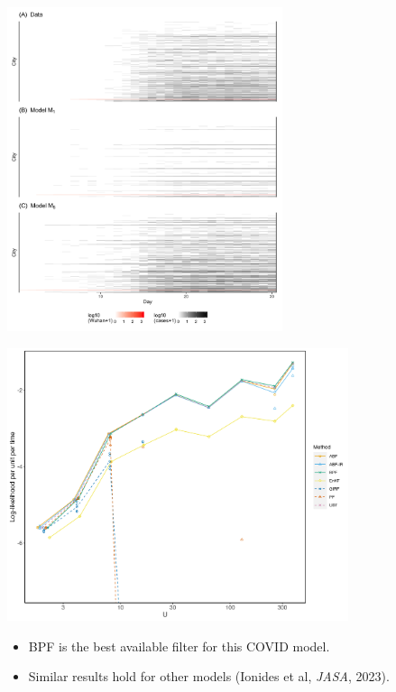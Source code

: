 \documentclass{beamer}
\begin{document}
\begin{frame}
  \begin{center}
    \includegraphics[height=9.5cm]{covid/panel_plot-1.png}
    \end{center}
\end{frame}


\begin{frame}
 \includegraphics[width=10cm]{covid/filter_tests10.png}

  \begin{itemize}
\item BPF is the best available filter for this COVID model.
\item Similar results hold for other models (Ionides et al, {\it JASA}, 2023).
  \end{itemize}
  
\end{frame}
\end{document}
